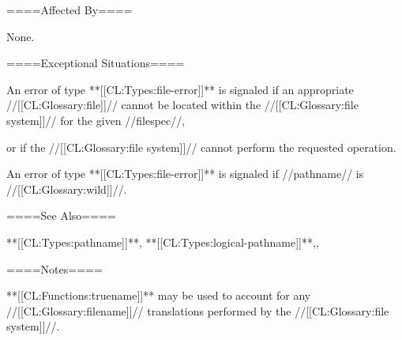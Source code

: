====Affected By====

None.

====Exceptional Situations====

An error of type **[[CL:Types:file-error]]** is signaled if an appropriate //[[CL:Glossary:file]]// cannot be located within the //[[CL:Glossary:file system]]// for the given //filespec//,

or if the //[[CL:Glossary:file system]]// cannot perform the requested operation.

An error of type **[[CL:Types:file-error]]** is signaled if //pathname// is //[[CL:Glossary:wild]]//.

====See Also====

**[[CL:Types:pathname]]**, **[[CL:Types:logical-pathname]]**,{\secref\FileSystemConcepts},

{\secref\PathnamesAsFilenames}

====Notes====


**[[CL:Functions:truename]]** may be used to account for any //[[CL:Glossary:filename]]// translations performed by the //[[CL:Glossary:file system]]//.

       
